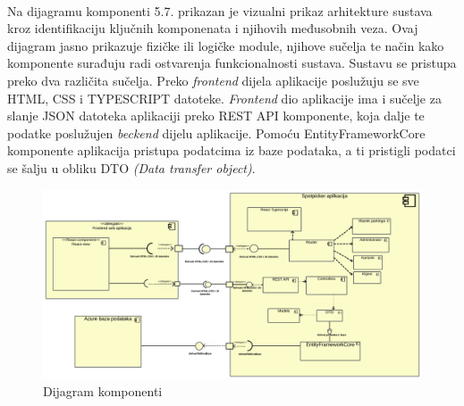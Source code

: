 \paragraph{}
{Na dijagramu komponenti 5.7. prikazan je  vizualni prikaz arhitekture sustava kroz identifikaciju ključnih komponenata i njihovih međusobnih veza. Ovaj dijagram jasno prikazuje fizičke ili logičke module, njihove sučelja te način kako komponente surađuju radi ostvarenja funkcionalnosti sustava. Sustavu se pristupa preko dva različita sučelja. Preko \emph{frontend} dijela aplikacije poslužuju se sve HTML, CSS i TYPESCRIPT datoteke. \emph{Frontend} dio aplikacije ima i sučelje za slanje JSON datoteka aplikaciji preko REST API komponente, koja dalje te podatke poslužujen \emph{beckend} dijelu aplikacije. Pomoću EntityFrameworkCore komponente aplikacija pristupa podatcima iz baze podataka, a ti pristigli podatci se šalju u obliku DTO \emph{(Data transfer object)}.
}

\begin{figure}[h!]
	\centering
	\includegraphics[width=1\linewidth]{dijagrami/DijagramKomponenti.png}
	\caption{Dijagram komponenti}
	\label{fig:componentdiagram}
	\vfill
\end{figure}

\FloatBarrier

\eject 